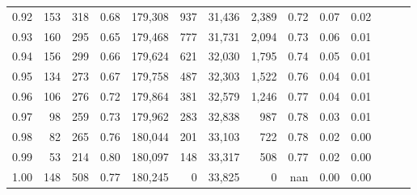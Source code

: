 \begin{tabular}{rrrrrrrrrrrrrr}
0.92 &    153 &  318 &  0.68 &  179,308 &      937 &  31,436 &   2,389 &  0.72 &  0.07 &      0.02 \\
0.93 &    160 &  295 &  0.65 &  179,468 &      777 &  31,731 &   2,094 &  0.73 &  0.06 &      0.01 \\
0.94 &    156 &  299 &  0.66 &  179,624 &      621 &  32,030 &   1,795 &  0.74 &  0.05 &      0.01 \\
0.95 &    134 &  273 &  0.67 &  179,758 &      487 &  32,303 &   1,522 &  0.76 &  0.04 &      0.01 \\
0.96 &    106 &  276 &  0.72 &  179,864 &      381 &  32,579 &   1,246 &  0.77 &  0.04 &      0.01 \\
0.97 &     98 &  259 &  0.73 &  179,962 &      283 &  32,838 &     987 &  0.78 &  0.03 &      0.01 \\
0.98 &     82 &  265 &  0.76 &  180,044 &      201 &  33,103 &     722 &  0.78 &  0.02 &      0.00 \\
0.99 &     53 &  214 &  0.80 &  180,097 &      148 &  33,317 &     508 &  0.77 &  0.02 &      0.00 \\
1.00 &    148 &  508 &  0.77 &  180,245 &        0 &  33,825 &       0 &   nan &  0.00 &      0.00 \\
\bottomrule
\end{tabular}
